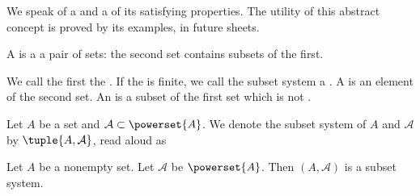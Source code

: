 
\sbasic





\sstart
{}


We speak of a
and a
of its
satisfying properties.
The utility of this
abstract concept
is proved by its examples,
in future sheets.


A
is a a pair of sets:
the second set contains
subsets of the first.

We call the first
the
.
If the
is finite,
we call the subset system a
.
A
is an element of the second set.
An
is a subset of the first set which is not
.



Let $A$ be a set and $\mathcal{A} \subset \powerset{A}$.
We denote the subset system of $A$ and $\mathcal{A}$
by $\tuple{A, \mathcal{A}}$, read aloud as 


\begin{expl}
Let $A$ be a nonempty set.
Let $\mathcal{A}$ be $\powerset{A}$.
Then $(A, \mathcal{A})$ is a subset system.
\end{expl}
\strats

